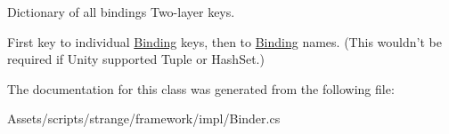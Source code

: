 Dictionary of all bindings Two-\/layer keys. 

First key to individual \hyperlink{classstrange_1_1framework_1_1impl_1_1_binding}{Binding} keys, then to \hyperlink{classstrange_1_1framework_1_1impl_1_1_binding}{Binding} names. (This wouldn't be required if Unity supported Tuple or Hash\-Set.) 

The documentation for this class was generated from the following file\-:\begin{DoxyCompactItemize}
\item 
Assets/scripts/strange/framework/impl/Binder.\-cs\end{DoxyCompactItemize}
